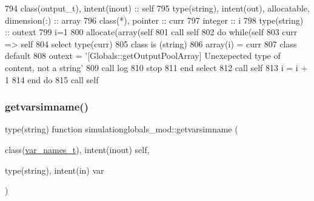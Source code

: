 \begin{DoxyCode}
794     \textcolor{keywordtype}{class}(output\_t), \textcolor{keywordtype}{intent(inout)} :: self
795     \textcolor{keywordtype}{type}(string), \textcolor{keywordtype}{intent(out)}, \textcolor{keywordtype}{allocatable}, \textcolor{keywordtype}{dimension(:)} :: array
796     \textcolor{keywordtype}{class}(*), \textcolor{keywordtype}{pointer} :: curr
797     \textcolor{keywordtype}{integer} :: i
798     \textcolor{keywordtype}{type}(string) :: outext
799     i=1
800     \textcolor{keyword}{allocate}(array(self%
801     \textcolor{keyword}{call }self%
802     \textcolor{keywordflow}{do} \textcolor{keywordflow}{while}(self%
803         curr => self%
804         \textcolor{keywordflow}{select type}(curr)
805 \textcolor{keywordflow}{        class is} (string)
806             array(i) = curr
807 \textcolor{keywordflow}{            class default}
808             outext = \textcolor{stringliteral}{'[Globals::getOutputPoolArray] Unexepected type of content, not a string'}
809             \textcolor{keyword}{call }log%
810             stop
811 \textcolor{keywordflow}{        end select}
812         \textcolor{keyword}{call }self%
813         i = i + 1
814 \textcolor{keywordflow}{    end do}
815     \textcolor{keyword}{call }self%
\end{DoxyCode}
\mbox{\label{namespacesimulationglobals__mod_ac83c53dd4e998e653981c7b1fa5dacbd}} 
\subsubsection{\texorpdfstring{getvarsimname()}{getvarsimname()}}
{\footnotesize\ttfamily type(string) function simulationglobals\+\_\+mod\+::getvarsimname (\begin{DoxyParamCaption}\item[{class(\mbox{\hyperlink{structsimulationglobals__mod_1_1var__names__t}{var\+\_\+names\+\_\+t}}), intent(inout)}]{self,  }\item[{type(string), intent(in)}]{var }\end{DoxyParamCaption})\hspace{0.3cm}{\ttfamily [private]}}



